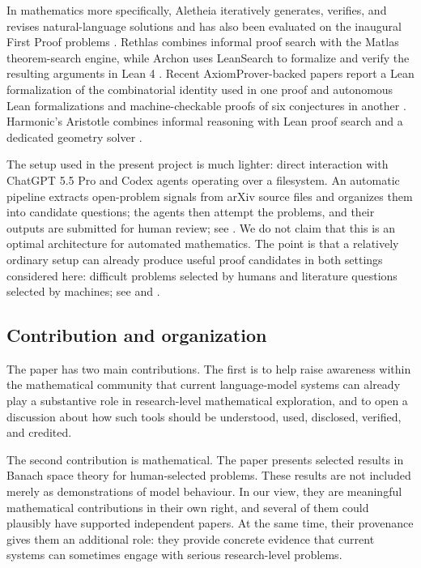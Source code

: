 \documentclass[11pt,reqno]{amsart}
\theoremstyle{plain}
\theoremstyle{definition}
\begin{document}
In mathematics more specifically, Aletheia iteratively generates, verifies, and revises natural-language solutions and has also been evaluated on the inaugural First Proof problems \cite{FengEtAl2026AletheiaFirstProof,FengEtAl2026AutonomousMathResearch}. Rethlas combines informal proof search with the Matlas theorem-search engine, while Archon uses LeanSearch to formalize and verify the resulting arguments in Lean 4 \cite{JuEtAl2026RethlasArchon}. Recent AxiomProver-backed papers report a Lean formalization of the combinatorial identity used in one proof and autonomous Lean formalizations and machine-checkable proofs of six conjectures in another \cite{ChenEtAl2026ParityKDifferentials,ChenOnoZhang2026PartitionPolynomials}. Harmonic's Aristotle combines informal reasoning with Lean proof search and a dedicated geometry solver \cite{AchimEtAl2025Aristotle}.

The setup used in the present project is much lighter: direct interaction with ChatGPT 5.5 Pro and Codex agents operating over a filesystem. An automatic pipeline extracts open-problem signals from arXiv source files and organizes them into candidate questions; the agents then attempt the problems, and their outputs are submitted for human review; see . We do not claim that this is an optimal architecture for automated mathematics. The point is that a relatively ordinary setup can already produce useful proof candidates in both settings considered here: difficult problems selected by humans and literature questions selected by machines; see  and .

\subsection{Contribution and organization}

The paper has two main contributions. The first is to help raise awareness within the mathematical community that current language-model systems can already play a substantive role in research-level mathematical exploration, and to open a discussion about how such tools should be understood, used, disclosed, verified, and credited.

The second contribution is mathematical.  The paper presents selected results in Banach space theory for human-selected problems. These results are not included merely as demonstrations of model behaviour. In our view, they are meaningful mathematical contributions in their own right, and several of them could plausibly have supported independent papers. At the same time, their provenance gives them an additional role: they provide concrete evidence that current systems can sometimes engage with serious research-level problems.
\end{document}
